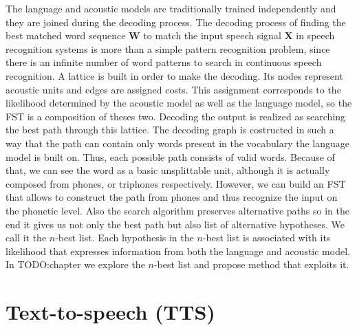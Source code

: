 The language and acoustic models are traditionally trained independently and they are joined during the decoding process.
The decoding process of finding the best matched word sequence $\textbf{W}$ to match the input speech signal $\textbf{X}$ in speech recognition systems is more than a simple pattern recognition problem, since there is an infinite number of word patterns to search in continuous speech recognition.
A lattice is built in order to make the decoding.
Its nodes represent acoustic units and edges are assigned costs.
This assignment corresponds to the likelihood determined by the acoustic model as well as the language model, so the FST is a composition of theses two.
Decoding the output is realized as searching the best path through this lattice.
\linebreak\linebreak
The decoding graph is costructed in such a way that the path can contain only words present in the vocabulary the language model is built on.
Thus, each possible path consists of valid words.
Because of that, we can see the word as a basic unsplittable unit, although it is actually composed from phones, or triphones respectively.
However, we can build an FST that allows to construct the path from phones and thus recognize the input on the phonetic level.
Also the search algorithm preserves alternative paths so in the end it gives us not only the best path but also list of alternative hypotheses.
We call it the $n$-best list.
Each hypothesis in the $n$-best list is associated with its likelihood that expresses information from both the language and acoustic model.
In TODO:chapter we explore the $n$-best list and propose method that exploits it.
\label{ASR-phn}
\section{Text-to-speech (TTS)}
